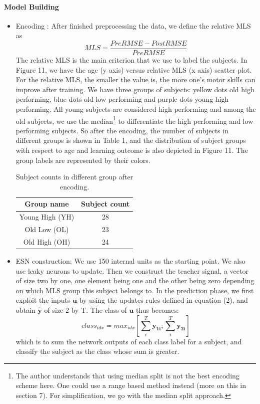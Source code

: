\documentclass[a4paper,11pt,oneside]{article}
\begin{document}
\paragraph{Model Building} 

\begin{itemize}
	\item Encoding : After finished preprocessing the data, we define the relative MLS as $$ MLS = \frac{PreRMSE - PostRMSE}{PreRMSE}  $$
	The relative MLS is the main criterion that we use to label the subjects.   
	In Figure 11, we have the age (y axis) versus relative MLS (x axis) scatter plot.  For the relative MLS, the smaller the value is, the more one's motor skills can improve after training. We have three groups of subjects: yellow dots old high performing, blue dots old low performing and purple dots young high performing. All young subjects are considered high performing and among the old subjects, we use the median\footnote{The author understands that using median split is not the best encoding scheme here. One could use a range based method instead (more on this in section 7). For simplification, we go with the median split approach.  } to differentiate the high performing and low performing subjects. So after the encoding, the number of subjects in different groups is shown in Table 1, and the distribution of subject groups with respect to age and learning outcome is also depicted in Figure 11. The group labels are represented by their colors.
	
	\begin{table}[h]
		\centering
		\begin{tabular}{||c c ||} 
			\hline
			Group name & Subject count  \\ [0.5ex] 
			\hline\hline
			Young High (YH)  & 28 \\ 
			Old Low (OL) & 23  \\
			Old High (OH) & 24  \\ [0.5ex] 
			\hline
		\end{tabular}
		\caption{Subject counts in different group after encoding.}
	\end{table}
	
	\item ESN construction:  We use 150 internal units as the starting point. We also use leaky neurons to update. Then we construct the teacher signal, a vector of size two by one, one element being one and the other being zero depending on which MLS group this subject belongs to. In the prediction phase, we first exploit the inputs $\mathbf{u}$ by using the updates rules defined in equation (2), and obtain $\hat{\mathbf{y}}$ of size 2 by T. The class of $\mathbf{u}$ thus becomes:
	$$ class_{idx} = max_{idx} [\sum_i^T\mathbf{y_{1i}}; \sum_i^T\mathbf{y_{2i}}] $$
	which is to sum the network outputs of each class label for a subject, and classify the subject as the class whose sum is greater.
	

\end{itemize}
\end{document}
